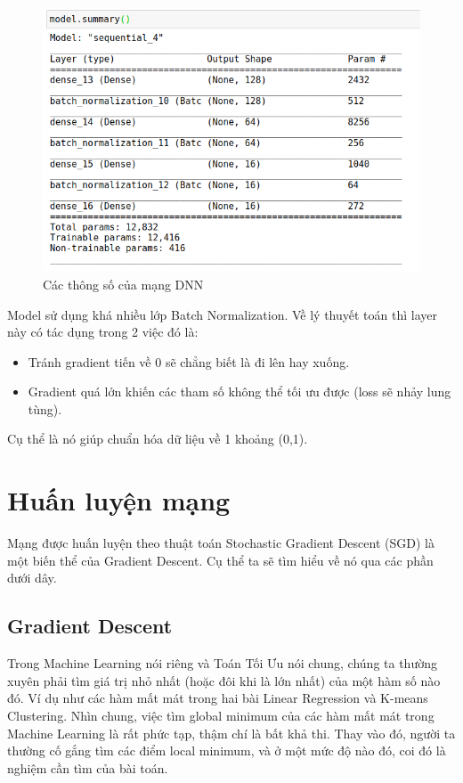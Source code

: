 \FloatBarrier
\begin{figure}[htp]
\begin{center}
\includegraphics[scale=1.3]{chap4/c4_figs/model_param.png}
\end{center}
\caption{Các thông số của mạng DNN}
\label{fig:model_params}
\end{figure}
\FloatBarrier


Model sử dụng khá nhiều lớp Batch Normalization. Về lý thuyết toán thì layer này có tác dụng trong 2 việc đó là:
\begin{itemize}
\item Tránh gradient tiến về 0 sẽ chẳng biết là đi lên hay xuống.
\item Gradient quá lớn khiến các tham số không thể tối ưu được (loss sẽ nhảy lung tùng).
\end{itemize}
Cụ thể là nó giúp chuẩn hóa dữ liệu về 1 khoảng (0,1).

\section{Huấn luyện mạng}
Mạng được huấn luyện theo thuật toán Stochastic Gradient Descent (SGD) là một biến thể của Gradient Descent. Cụ thể ta sẽ tìm hiểu về nó qua các phần dưới dây.

\subsection{Gradient Descent}
Trong Machine Learning nói riêng và Toán Tối Ưu nói chung, chúng ta thường xuyên phải tìm giá trị nhỏ nhất (hoặc đôi khi là lớn nhất) của một hàm số nào đó. Ví dụ như các hàm mất mát trong hai bài Linear Regression và K-means Clustering. Nhìn chung, việc tìm global minimum của các hàm mất mát trong Machine Learning là rất phức tạp, thậm chí là bất khả thi. Thay vào đó, người ta thường cố gắng tìm các điểm local minimum, và ở một mức độ nào đó, coi đó là nghiệm cần tìm của bài toán.

